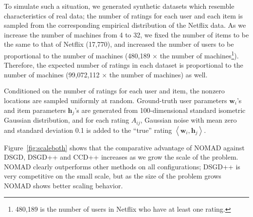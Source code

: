 \documentclass{vldb}
\newcommand{\hb}{\mathbf{h}}
\newcommand{\wb}{\mathbf{w}}
\newcommand{\inner}[2]{\left\langle #1,#2 \right\rangle}
\begin{document}
To simulate such a situation, we generated synthetic datasets which
resemble characteristics of real data; the number of ratings for each
user and each item is sampled from the corresponding empirical
distribution of the Netflix data.  As we increase the number of machines
from 4 to 32, we fixed the number of items to be the same to that of
Netflix (17,770), and increased the number of users to be proportional
to the number of machines (480,189 $\times$ the number of
machines\footnote{480,189 is the number of users in Netflix who have at
  least one rating. }).  Therefore, the expected number of ratings in
each dataset is proportional to the number of machines (99,072,112
$\times$ the number of machines) as well.

Conditioned on the number of ratings for each user and item, the
nonzero locations are sampled uniformly at random.  Ground-truth user
parameters $\wb_i$'s and item parameters $\hb_j$'s are generated from
100-dimensional standard isometric Gaussian distribution, and for each
rating $A_{ij}$, Gaussian noise with mean zero and standard deviation
0.1 is added to the ``true'' rating $\inner{\wb_i}{\hb_j}$.

Figure~\ref{fig:scaleboth} shows that the comparative advantage of
NOMAD against DSGD, DSGD++ and CCD++ increases as we grow the scale of
the problem.  NOMAD clearly outperforms other methods on all
configurations; DSGD++ is very competitive on the small scale, but as
the size of the problem grows NOMAD shows better scaling behavior.
\end{document}
